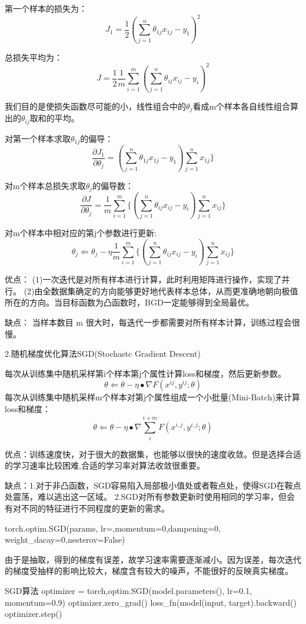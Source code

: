 \documentclass[openbib]{article}
\begin{document}
第一个样本的损失为：
$$J_1=\frac{1}{2}(\sum_{j=1}^{n}\theta_{1j}x_{1j}-y_1)^2$$

总损失平均为：
$$J=\frac{1}{2}\frac{1}{m}\sum_{i=1}^{m}(\sum_{j=1}^{n}\theta_{ij}x_{ij}-y_i)^2$$

我们目的是使损失函数尽可能的小，线性组合中的$\theta_j$看成m个样本各自线性组合算出的$\theta_{ij}$取和的平均。

对第一个样本求取$\theta_{1j}$的偏导：
$$\frac{\partial J_1}{\partial \theta_j}=(\sum_{j=1}^{n}\theta_{1j}x_{1j}-y_1)\sum_{j=1}^{n}x_{1j}\}$$

对m个样本总损失求取$\theta_j$的偏导数：
$$\frac{\partial J}{\partial \theta_j}=\frac{1}{m}\sum_{i=1}^{m}\{(\sum_{j=1}^{n}\theta_{ij}x_{ij}-y_i)\sum_{j=1}^{n}x_{ij}\}$$

对m个样本中相对应的第j个参数进行更新:
$$\theta_j \Leftarrow \theta_j - \eta \frac{1}{m} \sum_{i=1}^{m}\{(\sum_{j=1}^{n}\theta_{ij}x_{ij}-y_i)\sum_{j=1}^{n}x_{ij}\}$$

优点：
(1)一次迭代是对所有样本进行计算，此时利用矩阵进行操作，实现了并行。
(2)由全数据集确定的方向能够更好地代表样本总体，从而更准确地朝向极值所在的方向。当目标函数为凸函数时，BGD一定能够得到全局最优。

缺点：
当样本数目 m 很大时，每迭代一步都需要对所有样本计算，训练过程会很慢。

\begin{center}
	2.随机梯度优化算法SGD(Stochastc Gradient Descent)
\end{center}
每次从训练集中随机采样第i个样本第j个属性计算loss和梯度，然后更新参数。
$$\theta \Leftarrow \theta-\eta \bullet \nabla F(x^{ij},y^{ij};\theta)$$
每次从训练集中随机采样m个样本对第j个属性组成一个小批量(Mini-Batch)来计算loss和梯度：
$$\theta \Leftarrow \theta-\eta \bullet \nabla \sum_{i}^{i+m}F(x^{i,j},y^{i,j};\theta)$$

优点：训练速度快，对于很大的数据集，也能够以很快的速度收敛。但是选择合适的学习速率比较困难,合适的学习率对算法收敛很重要。

缺点：1.对于非凸函数，SGD容易陷入局部极小值处或者鞍点处，使得SGD在鞍点处震荡，难以逃出这一区域。
2.SGD对所有参数更新时使用相同的学习率，但会有对不同的特征进行不同程度的更新的需求。

torch.optim.SGD(params, lr=,momentum=0,dampening=0,\\weight\_dacay=0,nesterov=False)

由于是抽取，得到的梯度有误差，故学习速率需要逐渐减小。因为误差，每次迭代的梯度受抽样的影响比较大，梯度含有较大的噪声，不能很好的反映真实梯度。
\begin{Python}{SGD算法}
optimizer = torch,optim.SGD(model.parameters(), lr=0.1, momentum=0.9)
optimizer.zero_grad()
loss_fn(model(input, target).backward()
optimizer.step()
\end{Python}
\end{document}
